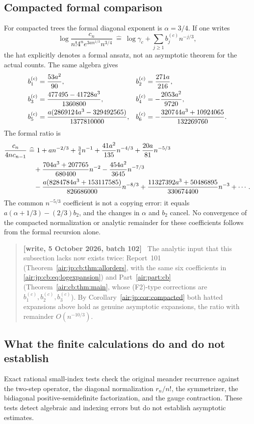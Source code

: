 \documentclass[11pt,letterpaper]{article}
\numberwithin{equation}{section}
\theoremstyle{remark}
\newenvironment{writenotejp}{\par\smallskip\begin{quote}\small\textbf{[write, 5 October 2026, batch 102]}\ }{\end{quote}\smallskip}
\begin{document}
\subsection{Compacted formal comparison}
For compacted trees the formal diagonal exponent is $\alpha=3/4$. If one writes
\[
 \log\frac{c_n}{n!4^ne^{3an^{1/3}}n^{3/4}}
 \ \widehat{=}\ \log\gamma_c+\sum_{j\ge1}b_j^{(c)}n^{-j/3},
\]
the hat explicitly denotes a formal ansatz, not an asymptotic theorem for the actual counts. The same algebra gives
\begin{align}
 b_1^{(c)}&=\frac{53a^2}{90},&b_2^{(c)}&=\frac{271a}{216},\notag\\
 b_3^{(c)}&=\frac{477495-41728a^3}{1360800},&
 b_4^{(c)}&=-\frac{2053a^2}{9720},\notag\\
 b_5^{(c)}&=\frac{a(2869124a^3-329492565)}{1377810000},&
 b_6^{(c)}&=-\frac{320744a^3+10924065}{132269760}.\label{air:jp:rb:eq:bcompacted}
\end{align}
The formal ratio is
\begin{align}
 \frac{c_n}{4nc_{n-1}}
 &\ \widehat{=}\ 1+an^{-2/3}+\tfrac34n^{-1}
       +\frac{41a^2}{135}n^{-4/3}+\frac{20a}{81}n^{-5/3}\notag\\
 &\quad+\frac{704a^3+207765}{680400}n^{-2}
       -\frac{454a^2}{3645}n^{-7/3}\notag\\
 &\quad-\frac{a(8284784a^3+153117585)}{826686000}n^{-8/3}
       +\frac{11327392a^3+50486895}{330674400}n^{-3}+\cdots.
\end{align}
The common $n^{-5/3}$ coefficient is not a copying error: it equals
$a(\alpha+1/3)-(2/3)b_2$, and the changes in $\alpha$ and $b_2$ cancel. No convergence of the compacted normalization or analytic remainder for these coefficients follows from the formal recursion alone.
\begin{writenotejp}
The analytic input that this subsection lacks now exists twice: Report~101 (Theorem~\ref{air:jp:cb:thm:allorders}, with the same six coefficients in \eqref{air:jp:cb:eq:logexpansion}) and Part~\ref{air:part:cb} (Theorem~\ref{air:cb:thm:main}, whose (F2)-type corrections are $b^{(c)}_1,b^{(c)}_2,b^{(c)}_3$). By Corollary~\ref{air:jp:cor:compacted} both hatted expansions above hold as genuine asymptotic expansions, the ratio with remainder $O(n^{-10/3})$.
\end{writenotejp}

\subsection{What the finite calculations do and do not establish}
Exact rational small-index tests check the original meander recurrence against the two-step operator, the diagonal normalization $r_n/n!$, the symmetrizer, the bidiagonal positive-semidefinite factorization, and the gauge contraction. These tests detect algebraic and indexing errors but do not establish asymptotic estimates.
\end{document}

